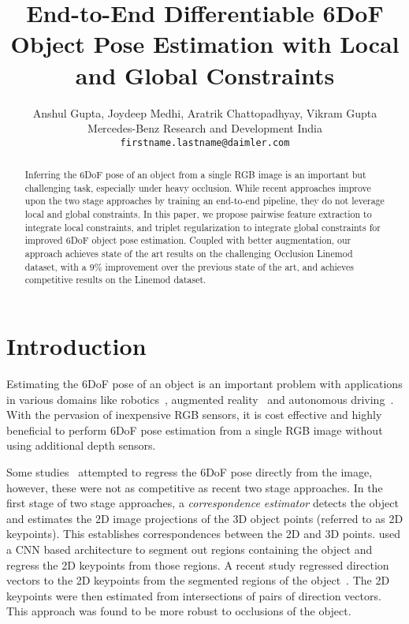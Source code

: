 \documentclass{article}
\title{End-to-End Differentiable 6DoF Object Pose Estimation with Local and Global Constraints}
\author{Anshul Gupta, Joydeep Medhi, Aratrik Chattopadhyay, Vikram Gupta \\
  Mercedes-Benz Research and Development India\\
\texttt{firstname.lastname@daimler.com}
}
\begin{document}
\maketitle

\begin{abstract}
Inferring the 6DoF pose of an object from a single RGB image is an important but challenging task, especially under heavy occlusion. While recent approaches improve upon the two stage approaches by training an end-to-end pipeline, they do not leverage local and global constraints. 
In this paper, we propose pairwise feature extraction to integrate local constraints, and triplet regularization to integrate global constraints for improved 6DoF object pose estimation.
Coupled with better augmentation, our approach achieves state of the art results on the challenging Occlusion Linemod dataset, with a $9\%$ improvement over the previous state of the art, and achieves competitive results on the Linemod dataset.







\end{abstract}


\section{Introduction}

Estimating the 6DoF pose of an object is an important problem with applications in various domains like robotics~\cite{correll2016analysis}, augmented reality~\cite{arpose} and autonomous driving~\cite{song2019apollocar3d}. With the pervasion of inexpensive RGB sensors, it is cost effective and highly beneficial to perform 6DoF pose estimation from a single RGB image without using additional depth sensors.


Some studies~\cite{kehl2017ssd}\cite{xiang2018posecnn} attempted to regress the 6DoF pose directly from the image, however, these were not as competitive as recent two stage approaches. In the first stage of two stage approaches, a \textit{correspondence estimator} detects the object and estimates the 2D image projections of the 3D object points (referred to as 2D keypoints). This establishes correspondences between the 2D and 3D points. \cite{rad2017bb8}\cite{tekin2018real}\cite{hu2019segmentation} used a CNN based architecture to segment out regions containing the object and regress the 2D keypoints from those regions. A recent study regressed direction vectors to the 2D keypoints from the segmented regions of the object~\cite{peng2019pvnet}. The 2D keypoints were then estimated from intersections of pairs of direction vectors. This approach was found to be more robust to occlusions of the object. 
\end{document}
